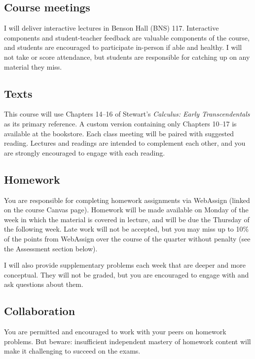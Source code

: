 \documentclass[11pt,twoside]{amsart}
\begin{document}
\subsection*{Course meetings}
I will deliver interactive lectures in Benson Hall (BNS) 117.  Interactive components and student-teacher feedback are valuable components of the course, and students are encouraged to participate in-person if able and healthy. I will not take or score attendance, but students are responsible for catching up on any material they miss.

\subsection*{Texts}
This course will use Chapters 14--16 of Stewart's \emph{Calculus: Early Transcendentals} as its primary reference. A custom version containing only Chapters 10--17 is available at the bookstore. Each class meeting will be paired with suggested reading. Lectures and readings are intended to complement each other, and you are strongly encouraged to engage with each reading.

\subsection*{Homework}
You are responsible for completing homework assignments via WebAssign (linked on the course Canvas page). Homework will be made available on Monday of the week in which the material is covered in lecture, and will be due the Thursday of the following week. Late work will not be accepted, but you may miss up to 10\% of the points from WebAssign over the course of the quarter without penalty (see the Assessment section below).

I will also provide supplementary problems each week that are deeper and more conceptual. They will not be graded, but you are encouraged to engage with and ask questions about them.

\subsection*{Collaboration}
You are permitted and encouraged to work with your peers on homework problems. But beware: insufficient independent mastery of homework content will make it challenging to succeed on the exams.
\end{document}

